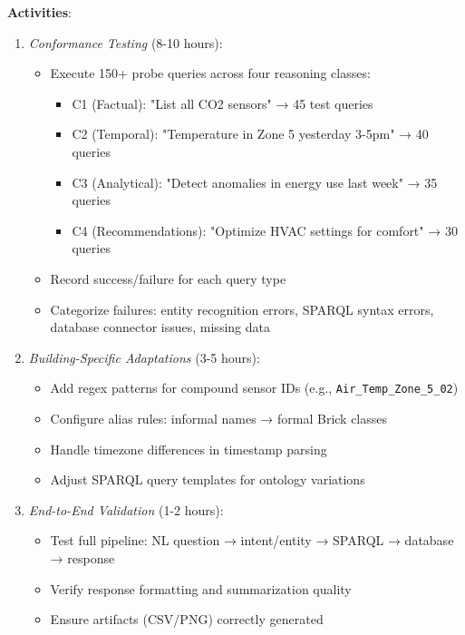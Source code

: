 \documentclass[acmlarge]{acmart}
\begin{document}
\textbf{Activities}:
\begin{enumerate}
    \item \textit{Conformance Testing} (8-10 hours):
    \begin{itemize}
        \item Execute 150+ probe queries across four reasoning classes:
        \begin{itemize}
            \item C1 (Factual): "List all CO2 sensors" → 45 test queries
            \item C2 (Temporal): "Temperature in Zone 5 yesterday 3-5pm" → 40 queries
            \item C3 (Analytical): "Detect anomalies in energy use last week" → 35 queries
            \item C4 (Recommendations): "Optimize HVAC settings for comfort" → 30 queries
        \end{itemize}
        \item Record success/failure for each query type
        \item Categorize failures: entity recognition errors, SPARQL syntax errors, database connector issues, missing data
    \end{itemize}
    
    \item \textit{Building-Specific Adaptations} (3-5 hours):
    \begin{itemize}
        \item Add regex patterns for compound sensor IDs (e.g., \texttt{Air\_Temp\_Zone\_5\_02})
        \item Configure alias rules: informal names → formal Brick classes
        \item Handle timezone differences in timestamp parsing
        \item Adjust SPARQL query templates for ontology variations
    \end{itemize}
    
    \item \textit{End-to-End Validation} (1-2 hours):
    \begin{itemize}
        \item Test full pipeline: NL question → intent/entity → SPARQL → database → response
        \item Verify response formatting and summarization quality
        \item Ensure artifacts (CSV/PNG) correctly generated
    \end{itemize}
\end{enumerate}
\end{document}
